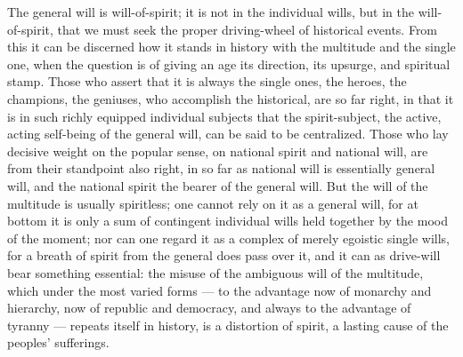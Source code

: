 \documentclass[12pt]{book}
\begin{document}
The general will is will-of-spirit; it is not in the individual wills, but in the will-of-spirit,
that we must seek the proper driving-wheel of historical events. From this it can be discerned how
it stands in history with the multitude and the single one, when the question is of giving an age
its direction, its upsurge, and spiritual stamp. Those who assert that it is always the single ones,
the heroes, the champions, the geniuses, who accomplish the historical, are so far right, in that it
is in such richly equipped individual subjects that the spirit-subject, the active, acting self-being
of the general will, can be said to be centralized. Those who lay decisive weight on the popular
sense, on national spirit and national will, are from their standpoint also right, in so far as
national will is essentially general will, and the national spirit the bearer of the general will.
But the will of the multitude is usually spiritless; one cannot rely on it as a general will, for at
bottom it is only a sum of contingent individual wills held together by the mood of the moment; nor
can one regard it as a complex of merely egoistic single wills, for a breath of spirit from the
general does pass over it, and it can as drive-will bear something essential: the misuse of the
ambiguous will of the multitude, which under the most varied forms --- to the advantage now of
monarchy and hierarchy, now of republic and democracy, and always to the advantage of tyranny ---
repeats itself in history, is a distortion of spirit, a lasting cause of the peoples' sufferings.
\end{document}
